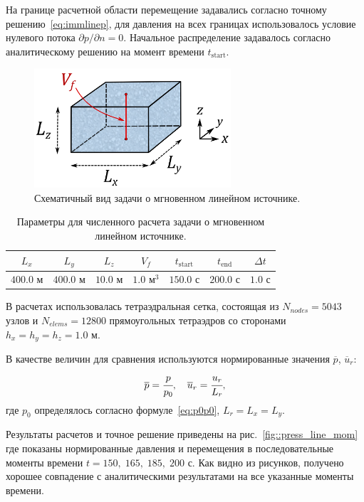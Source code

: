 На границе расчетной области перемещение задавались согласно 
точному решению~\eqref{eq:immlinep}, для давления на всех границах использовалось условие
нулевого потока $\partial p/ \partial n = 0$. Начальное распределение задавалось
согласно аналитическому решению на момент времени $t_{\text{start}}$.
%
\begin{figure}[t!]
\centering
\includegraphics[width=0.65\textwidth]{./figs/immline.png}
\caption{Схематичный вид задачи о мгновенном линейном источнике.}\label{fig:immline}
\end{figure}
% 
%
\begin{table}[h!]
\centering
%
\renewcommand{\arraystretch}{1.5}
\renewcommand{\tabcolsep}{6 pt} 
\begin{tabular}{|c|c|c|c|c|c|c|}
\hline
$L_x$ & $L_y$ & $L_z$ & $V_f$ & $t_{\text{start}}$ & $t_{\text{end}}$ & $\Delta t$\\
\hline
 $400.0$ м & $400.0$ м & $10.0$ м & $1.0 \text{ м}^3$ & $150.0$ с & $200.0$ с & $1.0$ с\\
\hline
\end{tabular}
%
\caption{Параметры для численного расчета задачи о мгновенном линейном источнике.}\label{tab:immline}
\end{table}
%

В расчетах использовалась тетраэдральная сетка, состоящая из 
$N_{nodes} = 5043$ узлов и $N_{elems} = 12800$ прямоугольных тетраэдров со сторонами $h_x = h_y = h_z = 1.0$ м.

В качестве величин для сравнения используются нормированные значения $\overline{p}$, $\overline{u}_r$:
%
\begin{equation*}
%
\overline{p} = \cfrac{p}{p_0}, \quad \overline{u}_r = \cfrac{u_r}{L_r},
%
\end{equation*}
%
где $p_0$ определялось согласно формуле~\eqref{eq:p0p0}, $L_r = L_x = L_y$.
 

Результаты расчетов и точное решение приведены на
рис.~\ref{fig::press_line_mom}
где показаны нормированные давления и перемещения в последовательные моменты времени
$t = 150, \; 165, \; 185, \; 200$ с. Как видно из рисунков, получено
хорошее совпадение с аналитическими результатами на все указанные моменты времени.

